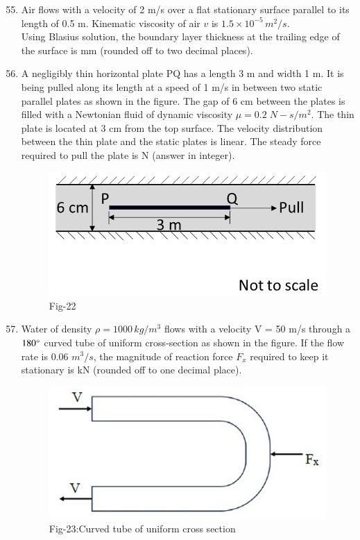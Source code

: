 \documentclass[journal]{IEEEtran}
\theoremstyle{remark}
\begin{document}
\begin{enumerate}[itemsep=1em]
\setcounter{enumi}{54}
\item Air flows with a velocity of 2 m/s over a flat stationary surface parallel to its length of 0.5 m. Kinematic viscosity of air $v$ is $1.5 \times 10^{-5} \,m^2/s$.  \\
Using Blasius solution, the boundary layer thickness at the trailing edge of the surface is \underline{\hspace{2cm}} mm (rounded off to two decimal places). 
\end{enumerate}

\begin{enumerate}[itemsep=1em]
\setcounter{enumi}{55}
\item A negligibly thin horizontal plate PQ has a length 3 m and width 1 m. It is being pulled along its length at a speed of 1 m/s in between two static parallel plates as shown in the figure. The gap of 6 cm between the plates is filled with a Newtonian fluid of dynamic viscosity $\mu = 0.2\; N-s/m^2$. The thin plate is located at 3 cm from the top surface. The velocity distribution between the thin plate and the static plates is linear.  The steady force required to pull the plate is \underline{\hspace{2cm}}N (answer in integer). 
\begin{figure}[H]
    \centering
    \includegraphics[width=0.4\columnwidth]{figs/fig-22.jpeg}
    \caption*{Fig-22}
    \label{fig:22}
\end{figure}
\end{enumerate}

\begin{enumerate}[itemsep=1em]
\setcounter{enumi}{56}
\item Water of density $\rho = 1000 \,kg/m^3$ flows with a velocity V = 50 m/s through a $180\degree$ curved tube of uniform cross-section as shown in the figure. If the flow rate is 0.06 $m^3/s$, the magnitude of reaction force $F_x$ required to keep it stationary is \underline{\hspace{2cm}} kN (rounded off to one decimal place).
\newpage
\vspace*{0.25cm}
\begin{figure}[H]
    \centering
    \includegraphics[width=0.4\columnwidth]{figs/fig-23.jpeg}
    \caption*{Fig-23:Curved tube of uniform cross section}
    \label{fig:23}
\end{figure}
\end{enumerate}
\end{document}
